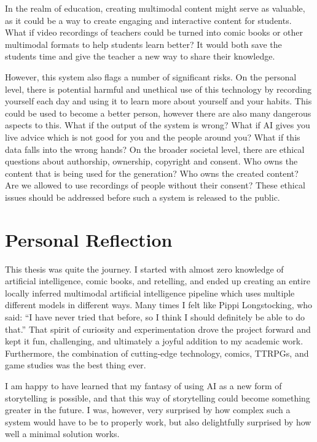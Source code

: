 In the realm of education, creating multimodal content might serve as valuable, as it could be a way to create engaging and interactive content for students. What if video recordings of teachers could be turned into comic books or other multimodal formats to help students learn better? It would both save the students time and give the teacher a new way to share their knowledge.

However, this system also flags a number of significant risks. On the personal level, there is potential harmful and unethical use of this technology by recording yourself each day and using it to learn more about yourself and your habits. This could be used to become a better person, however there are also many dangerous aspects to this. What if the output of the system is wrong? What if AI gives you live advice which is not good for you and the people around you? What if this data falls into the wrong hands? On the broader societal level, there are ethical questions about authorship, ownership, copyright and consent. Who owns the content that is being used for the generation? Who owns the created content? Are we allowed to use recordings of people without their consent? These ethical issues should be addressed before such a system is released to the public.

\section{Personal Reflection}
This thesis was quite the journey. I started with almost zero knowledge of artificial intelligence, comic books, and retelling, and ended up creating an entire locally inferred multimodal artificial intelligence pipeline which uses multiple different models in different ways. Many times I felt like Pippi Longstocking, who said: “I have never tried that before, so I think I should definitely be able to do that.” That spirit of curiosity and experimentation drove the project forward and kept it fun, challenging, and ultimately a joyful addition to my academic work. Furthermore, the combination of cutting-edge technology, comics, TTRPGs, and game studies was the best thing ever.

I am happy to have learned that my fantasy of using AI as a new form of storytelling is possible, and that this way of storytelling could become something greater in the future. I was, however, very surprised by how complex such a system would have to be to properly work, but also delightfully surprised by how well a minimal solution works.


